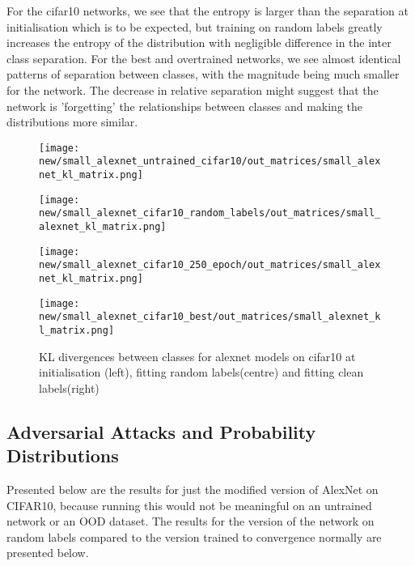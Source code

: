 \documentclass{article}
\begin{document}
            For the cifar10 networks, we see that the entropy is larger than the separation at initialisation which is to be expected, but training on random labels greatly increases the entropy of the distribution with negligible difference in the inter class separation. For the best and overtrained networks, we see almost identical patterns of separation between classes, with the magnitude being much smaller for the network. The decrease in relative separation might suggest that the network is 'forgetting' the relationships between classes and making the distributions more similar. 
            \begin{figure}[H]
                \centering
                \begin{minipage}{0.25\textwidth}
                    \centering
                    \texttt{[image: new/small\_alexnet\_untrained\_cifar10/out\_matrices/small\_alexnet\_kl\_matrix.png]}
                \end{minipage}%
                \hfill
                \begin{minipage}{0.25\textwidth}
                    \centering
                    \texttt{[image: new/small\_alexnet\_cifar10\_random\_labels/out\_matrices/small\_alexnet\_kl\_matrix.png]}
                \end{minipage}%
                \hfill
                \begin{minipage}{0.25\textwidth}
                    \centering
                    \texttt{[image: new/small\_alexnet\_cifar10\_250\_epoch/out\_matrices/small\_alexnet\_kl\_matrix.png]}
                \end{minipage}%
                \hfill
                \begin{minipage}{0.25\textwidth}
                    \centering
                    \texttt{[image: new/small\_alexnet\_cifar10\_best/out\_matrices/small\_alexnet\_kl\_matrix.png]}
                \end{minipage}
                \caption{KL divergences between classes for alexnet models on cifar10 at initialisation (left), fitting random labels(centre) and fitting clean labels(right)}
                \label{fig:cross_kl_divergence_small_alexnet}
            \end{figure}
        
        \subsection{Adversarial Attacks and Probability Distributions}
            Presented below are the results for just the modified version of AlexNet on CIFAR10, because running this would not be meaningful on an untrained network or an OOD dataset. The results for the version of the network on random labels compared to the version trained to convergence normally are presented below. 
        
\end{document}
